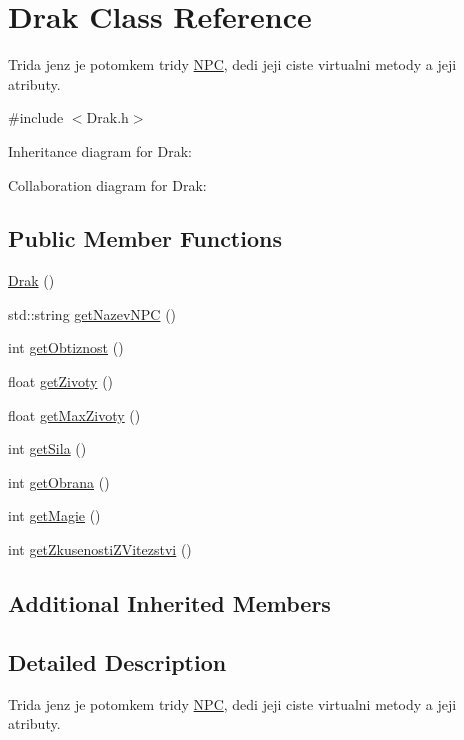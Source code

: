 \hypertarget{class_drak}{\section{Drak Class Reference}
\label{class_drak}
}


Trida jenz je potomkem tridy \hyperlink{class_n_p_c}{N\-P\-C}, dedi jeji ciste virtualni metody a jeji atributy.  




{\ttfamily \#include $<$Drak.\-h$>$}



Inheritance diagram for Drak\-:


Collaboration diagram for Drak\-:
\subsection*{Public Member Functions}
\begin{DoxyCompactItemize}
\item 
\hyperlink{class_drak_a473a78a046a0d88fbfa984c6d3794ae7}{Drak} ()
\item 
std\-::string \hyperlink{class_drak_aa05fee73171bd5cc51c775219563457d}{get\-Nazev\-N\-P\-C} ()
\item 
int \hyperlink{class_drak_ac6521d606193290f6efbfc6eccb189eb}{get\-Obtiznost} ()
\item 
float \hyperlink{class_drak_a4d22ef3d2ec5603fb1d16862f53af8e8}{get\-Zivoty} ()
\item 
float \hyperlink{class_drak_ae3401cac281916731f1ebd7ae75e4974}{get\-Max\-Zivoty} ()
\item 
int \hyperlink{class_drak_ae325f0aa586d1ed2a29a4f61b8050d20}{get\-Sila} ()
\item 
int \hyperlink{class_drak_a0b7ee8e2ab6418a859c55b50b5127f95}{get\-Obrana} ()
\item 
int \hyperlink{class_drak_a9e874d27abc9bb77d4f58fb9b35f33b7}{get\-Magie} ()
\item 
int \hyperlink{class_drak_ae5a7ad1828dedaa927a32f943be2629b}{get\-Zkusenosti\-Z\-Vitezstvi} ()
\end{DoxyCompactItemize}
\subsection*{Additional Inherited Members}


\subsection{Detailed Description}
Trida jenz je potomkem tridy \hyperlink{class_n_p_c}{N\-P\-C}, dedi jeji ciste virtualni metody a jeji atributy. 

